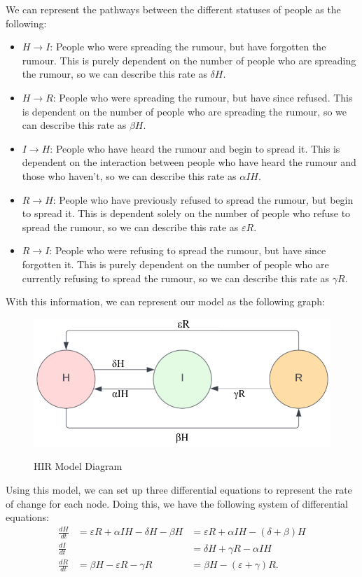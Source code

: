 \documentclass[11pt]{article}
\begin{document}
We can represent the pathways between the different statuses of people as the following:
\begin{itemize}
    \item $H \rightarrow I$: People who were spreading the rumour, but have forgotten the rumour.  This is purely dependent on the number of people who are spreading the rumour, so we can describe this rate as $\delta H$.
    \item $H \rightarrow R$: People who were spreading the rumour, but have since refused.  This is dependent on the number of people who are spreading the rumour, so we can describe this rate as $\beta H$.
    \item $I \rightarrow H$: People who have heard the rumour and begin to spread it.  This is dependent on the interaction between people who have heard the rumour and those who haven't, so we can describe this rate as $\alpha I H$.
    \item $R \rightarrow H$: People who have previously refused to spread the rumour, but begin to spread it.  This is dependent solely on the number of people who refuse to spread the rumour, so we can describe this rate as $\varepsilon R$.
    \item $R \rightarrow I$: People who were refusing to spread the rumour, but have since forgotten it.  This is purely dependent on the number of people who are currently refusing to spread the rumour, so we can describe this rate as $\gamma R$.
\end{itemize}
With this information, we can represent our model as the following graph:
\begin{figure}[H]
    \centering
    \caption{HIR Model Diagram}
    \includegraphics[width=0.8\columnwidth]{models/HIR_Model.png}
    \label{HIR-diagram}
\end{figure}
Using this model, we can set up three differential equations to represent the rate of change for each node.  
Doing this, we have the following system of differential equations:
\begin{align*}
    \frac{d H}{d t} & = \varepsilon R + \alpha I H - \delta H - \beta H & = \varepsilon R + \alpha I H - (\delta + \beta) H \\ %
    \frac{d I}{d t} & & = \delta H + \gamma R - \alpha I H \\
    \frac{d R}{d t} & = \beta H - \varepsilon R - \gamma R & = \beta H - (\varepsilon + \gamma) R.
\end{align*}
\end{document}
